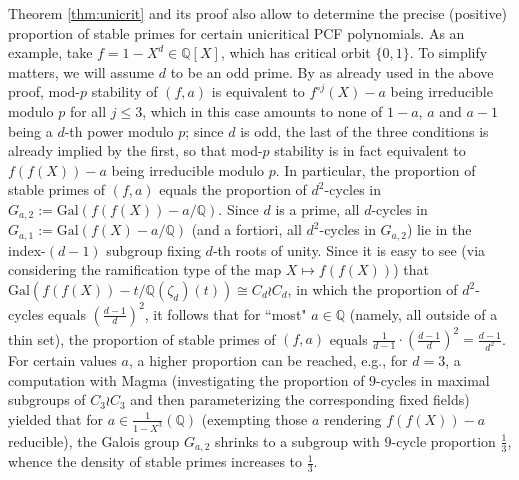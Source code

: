 \documentclass[a4paper]{amsart}
\begin{document}
\begin{remark}
Theorem \ref{thm:unicrit} and its proof also allow to determine the precise (positive) proportion of stable primes for certain unicritical PCF polynomials. As an example, take $f=1-X^d\in \mathbb{Q}[X]$, which has critical orbit $\{0,1\}$. To simplify matters, we will assume $d$ to be an odd prime. By \cite[Theorem 13]{DDetal} as already used in the above proof, mod-$p$ stability of $(f,a)$ is equivalent to $f^{\circ j}(X)-a$ being irreducible modulo $p$ for all $j\le 3$, which in this case amounts to none of $1-a$, $a$ and $a-1$ being a $d$-th power modulo $p$; since $d$ is odd, the last of the three conditions is already implied by the first, so that mod-$p$ stability is in fact equivalent to $f(f(X))-a$ being irreducible modulo $p$. In particular,
the proportion of stable primes of $(f,a)$ equals the proportion of $d^2$-cycles in $G_{a,2}:=\textrm{Gal}(f(f(X))-a/\mathbb{Q})$.
Since $d$ is a prime, all $d$-cycles in $G_{a,1}:=\textrm{Gal}(f(X)-a/\mathbb{Q})$ (and a fortiori, all $d^2$-cycles in $G_{a,2}$) lie in the index-$(d-1)$ subgroup fixing $d$-th roots of unity. Since it is easy to see (via considering the ramification type of the map $X\mapsto f(f(X))$) that $\textrm{Gal}(f(f(X))-t/\mathbb{Q}(\zeta_d)(t))\cong C_d\wr C_d$, in which the proportion of $d^2$-cycles equals $(\frac{d-1}{d})^2$, it follows that for ``most" $a\in \mathbb{Q}$ (namely, all outside of a thin set), the proportion of stable primes of $(f,a)$ equals $\frac{1}{d-1}\cdot (\frac{d-1}{d})^2=\frac{d-1}{d^2}$. For certain values $a$, a higher proportion can be reached, e.g., for $d=3$, a computation with Magma (investigating the proportion of $9$-cycles in maximal subgroups of $C_3\wr C_3$ and then parameterizing the corresponding fixed fields) yielded that for $a\in \frac{1}{1-X^3}(\mathbb{Q})$ (exempting those $a$ rendering $f(f(X))-a$ reducible), the Galois group $G_{a,2}$ shrinks to a subgroup with $9$-cycle proportion $\frac{1}{3}$, whence the density of stable primes increases to $\frac{1}{3}$.
\end{remark}


 
 
\end{document}
